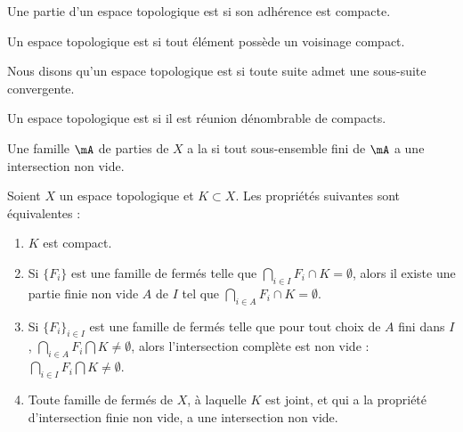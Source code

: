 \begin{definition}
    Une partie d'un espace topologique est  si son adhérence est compacte.
\end{definition}

\begin{definition}  \label{DefEIBYooAWoESf}
    Un espace topologique est  si tout élément possède un voisinage compact.
\end{definition}

\begin{definition}
    Nous disons qu'un espace topologique est  si toute suite admet une sous-suite convergente.
\end{definition}

\begin{definition}      \label{DefFCGBooLpnSAK}
    Un espace topologique est  si il est réunion dénombrable de compacts.
\end{definition}

\begin{definition}
    Une famille \( \mA\) de parties de \( X\) a la  si tout sous-ensemble fini de \( \mA\) a une intersection non vide.
\end{definition}

\begin{proposition}\label{PropXKUMiCj}
    Soient \( X\) un espace topologique et \( K\subset X\). Les propriétés suivantes sont équivalentes :
    \begin{enumerate}
        \item\label{ItemXYmGHFai}
            \( K\) est compact.
        \item\label{ItemXYmGHFaii}
            Si \( \{ F_i \}\) est une famille de fermés telle que \( \bigcap_{i\in I}F_i \cap K =\emptyset\), alors il existe une partie finie non vide \( A\) de \( I\) tel que \( \bigcap_{i\in A}F_i \cap K =\emptyset\).
        \item\label{ItemXYmGHFaiii}
            Si \( \{ F_i \}_{i\in I}\) est une famille de fermés telle que pour tout choix de \( A\) fini dans \( I\), \( \bigcap_{i\in A}F_i \bigcap K \neq\emptyset\), alors l'intersection complète est non vide : \( \bigcap_{i\in I}F_i \bigcap K\neq\emptyset\).
        \item\label{ItemXYmGHFaiv}
            Toute famille de fermés de \( X \), à laquelle \( K \) est joint, et qui a la propriété d'intersection finie non vide, a une intersection non vide.
    \end{enumerate}
\end{proposition}

